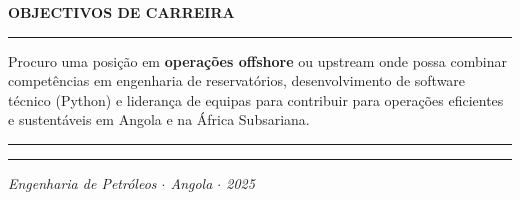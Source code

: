 \documentclass[10pt,a4paper]{article}
\newcommand{\mainSection}[1]{%
  \vspace{1pt}%
  {\bfseries\color{navy}\large\MakeUppercase{#1}}%
  \par\vspace{0pt}%
  {\color{navy}\rule{\linewidth}{1.0pt}}%
  \par\vspace{1pt}%
}
\begin{document}
\begin{minipage}[t]{\dimexpr 0.705\paperwidth - 26pt}
  \mainSection{Objectivos de Carreira}
  Procuro uma posição em \textbf{operações offshore} ou upstream onde possa combinar
  competências em engenharia de reservatórios, desenvolvimento de software técnico
  (Python) e liderança de equipas para contribuir para operações eficientes e
  sustentáveis em Angola e na África Subsariana.

  \vspace{2pt}
  {\color{navy}\rule{\linewidth}{0.8pt}}\par
  \vspace{1pt}
  {\color{goldrule}\rule{\linewidth}{0.4pt}}\par
  \vspace{2pt}
  {\footnotesize\color{mutedtext}\itshape
    Engenharia de Petróleos $\cdot$ Angola $\cdot$ 2025}

\end{minipage}
\end{document}
